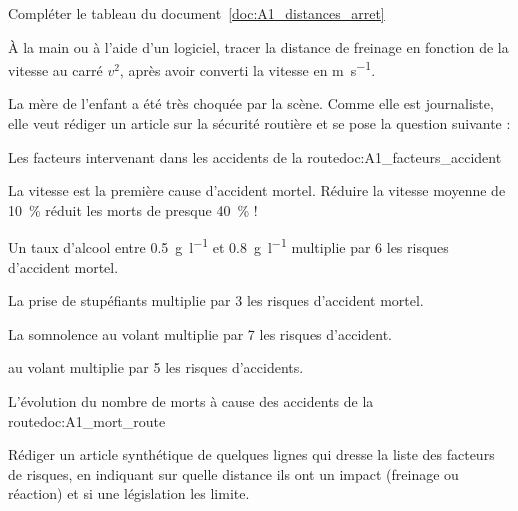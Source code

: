 \numeroQuestion
Compléter le tableau du document~\ref{doc:A1_distances_arret}



\newpage
\vspace*{-36pt}

\mesure
À la main ou à l'aide d'un logiciel, tracer la distance de freinage en fonction de la vitesse au carré $v^2$, après avoir converti la vitesse en \unit{\m\per\s}.



\begin{contexte}
  La mère de l'enfant a été très choquée par la scène.
  Comme elle est journaliste, elle veut rédiger un article sur la sécurité routière et se pose la question suivante :
  
\end{contexte}

\begin{doc}{Les facteurs intervenant dans les accidents de la route}{doc:A1_facteurs_accident}
  \begin{listePoints}[2]
    \item La vitesse est la première cause d'accident mortel.
    Réduire la vitesse moyenne de \qty{10}{\percent} réduit les morts de presque \qty{40}{\percent} !
    \item Un taux d'alcool entre \qty{0,5}{\g\per\litre} et \qty{0,8}{\g\per\litre} multiplie par 6 les risques d'accident mortel.
    \item La prise de stupéfiants multiplie par 3 les risques d'accident mortel.
    \item La somnolence au volant multiplie par 7 les risques d'accident.
    \item {} au volant multiplie par 5 les risques d'accidents.
  \end{listePoints}
\end{doc}


\begin{doc}{L'évolution du nombre de morts à cause des accidents de la route}{doc:A1_mort_route}
  \centering
\end{doc}

\numeroQuestion
Rédiger un article synthétique de quelques lignes qui dresse la liste des facteurs de risques, en indiquant sur quelle distance ils ont un impact (freinage ou réaction) et si une législation les limite.
